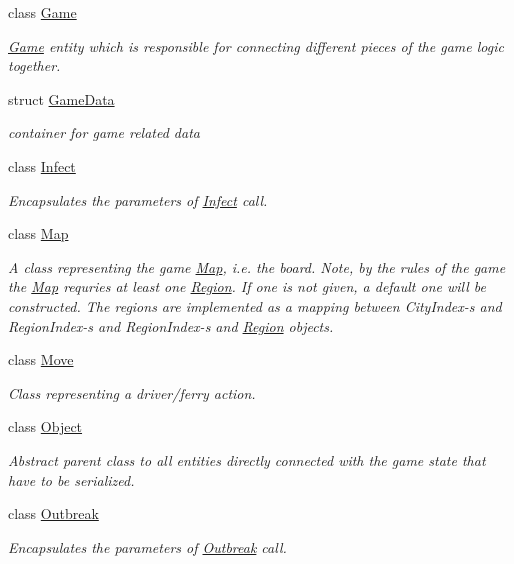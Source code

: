 \begin{DoxyCompactItemize}
class \hyperlink{classpan_1_1_game}{Game}
\begin{DoxyCompactList}\small\item\em \hyperlink{classpan_1_1_game}{Game} entity which is responsible for connecting different pieces of the game logic together. \end{DoxyCompactList}\item 
struct \hyperlink{structpan_1_1_game_data}{Game\+Data}
\begin{DoxyCompactList}\small\item\em container for game related data \end{DoxyCompactList}\item 
class \hyperlink{classpan_1_1_infect}{Infect}
\begin{DoxyCompactList}\small\item\em Encapsulates the parameters of \hyperlink{classpan_1_1_infect}{Infect} call. \end{DoxyCompactList}\item 
class \hyperlink{classpan_1_1_map}{Map}
\begin{DoxyCompactList}\small\item\em A class representing the game \hyperlink{classpan_1_1_map}{Map}, i.\+e. the board. Note, by the rules of the game the \hyperlink{classpan_1_1_map}{Map} requries at least one \hyperlink{classpan_1_1_region}{Region}. If one is not given, a default one will be constructed. The regions are implemented as a mapping between City\+Index-\/s and Region\+Index-\/s and Region\+Index-\/s and \hyperlink{classpan_1_1_region}{Region} objects. \end{DoxyCompactList}\item 
class \hyperlink{classpan_1_1_move}{Move}
\begin{DoxyCompactList}\small\item\em Class representing a driver/ferry action. \end{DoxyCompactList}\item 
class \hyperlink{classpan_1_1_object}{Object}
\begin{DoxyCompactList}\small\item\em Abstract parent class to all entities directly connected with the game state that have to be serialized. \end{DoxyCompactList}\item 
class \hyperlink{classpan_1_1_outbreak}{Outbreak}
\begin{DoxyCompactList}\small\item\em Encapsulates the parameters of \hyperlink{classpan_1_1_outbreak}{Outbreak} call. \end{DoxyCompactList}\item 

\end{DoxyCompactItemize}
